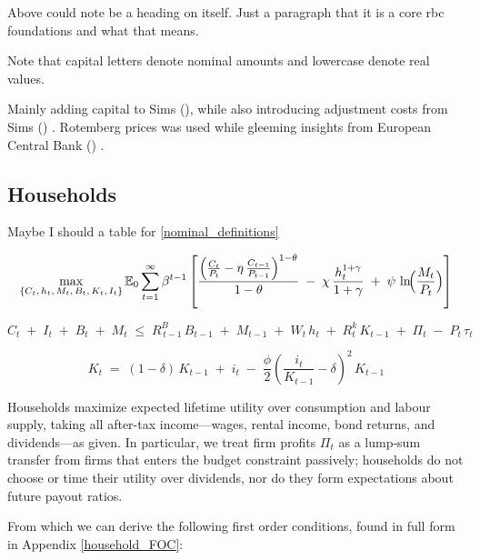 \documentclass[11pt,preprint]{elsarticle}
\numberwithin{equation}{section}
\numberwithin{figure}{section}
\numberwithin{table}{section}
\begin{document}
Above could note be a heading on itself. Just a paragraph that it is a
core rbc foundations and what that means.

Note that capital letters denote nominal amounts and lowercase denote
real values.

Mainly adding capital to Sims
(), while also introducing
adjustment costs from Sims () .
Rotemberg prices was used while gleeming insights from European Central
Bank () .

\subsection{Households}\label{households}

Maybe I should a table for \eqref{nominal_definitions}

\begin{equation}
\max_{\{C_t,\,h_t,\,M_t,\,B_t,\,K_t,\,I_t\}}
\mathbb{E}_0 \sum_{t=1}^{\infty} \beta^{t-1}
\left[
\frac{\Bigl(\frac{C_t}{P_t} - \eta\,\frac{C_{t-1}}{P_{t-1}}\Bigr)^{1-\theta}}{1-\theta}
\;-\;\chi\,\frac{h_t^{1+\gamma}}{1+\gamma}
\;+\;\psi\,\ln\!\Bigl(\frac{M_t}{P_t}\Bigr)
\right]
\label{lifetime_utility_nominal}
\end{equation}

\begin{equation}
C_t \;+\; I_t \;+\; B_t \;+\; M_t
\;\le\;
R^B_{\,t-1}\,B_{t-1}
\;+\; M_{t-1}
\;+\; W_t\,h_t
\;+\; R^k_t\,K_{t-1}
\;+\; \Pi_t
\;-\; P_t\,\tau_t
\label{flow_constraint_nominal}
\end{equation}

\begin{equation}
K_t
\;=\;
(1 - \delta)\,K_{t-1}
\;+\; i_t
\;-\;\frac{\phi}{2}
\left(\frac{i_t}{K_{t-1}} - \delta\right)^{2}
\,K_{t-1}
\label{capital_accumulation_real}
\end{equation}

Households maximize expected lifetime utility over consumption and
labour supply, taking all after-tax income---wages, rental income, bond
returns, and dividends---as given. In particular, we treat firm profits
\(\Pi_t\) as a lump‐sum transfer from firms that enters the budget
constraint passively; households do not choose or time their utility
over dividends, nor do they form expectations about future payout
ratios.

From which we can derive the following first order conditions, found in
full form in Appendix \ref{household_FOC}:
\end{document}
